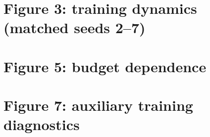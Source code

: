 \documentclass{article}
\begin{document}
\section*{Figure 3: training dynamics (matched seeds 2--7)}
\noindent\resizebox{\linewidth}{!}{}
\section*{Figure 5: budget dependence}
\noindent\resizebox{\linewidth}{!}{}
\section*{Figure 7: auxiliary training diagnostics}
\noindent\resizebox{\linewidth}{!}{}
\end{document}
